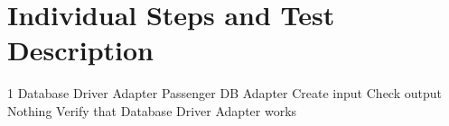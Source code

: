 \section{Individual Steps and Test Description}

\testCase
	{1}
	{Database Driver Adapter \ra{} Passenger DB Adapter}
	{Create input}
	{Check output}
	{Nothing}
	{Verify that Database Driver Adapter works}